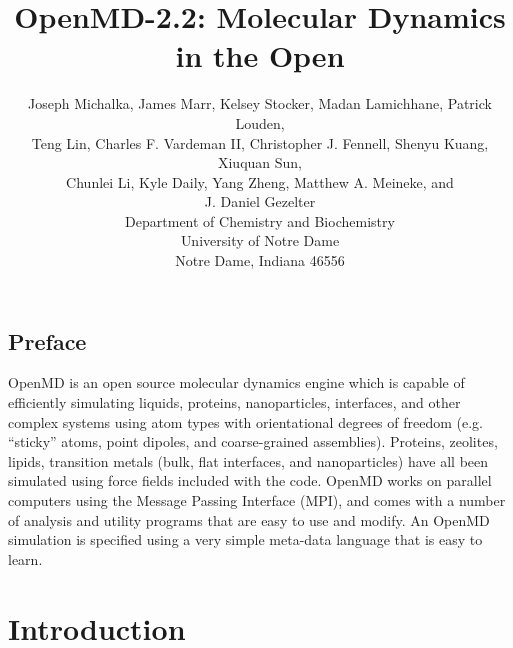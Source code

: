 \documentclass[]{book}
\begin{document}





\title{{\sc OpenMD-2.2}: Molecular Dynamics in the Open}

\author{Joseph Michalka, James Marr, Kelsey Stocker, Madan Lamichhane,
  Patrick Louden, \\
  Teng Lin, Charles F. Vardeman II, Christopher J. Fennell, Shenyu
  Kuang, Xiuquan Sun, \\
  Chunlei Li, Kyle Daily, Yang Zheng, Matthew A. Meineke, and \\
  J. Daniel Gezelter \\
  Department of Chemistry and Biochemistry\\
  University of Notre Dame\\
  Notre Dame, Indiana 46556}

\maketitle

\section*{Preface}
{\sc OpenMD} is an open source molecular dynamics engine which is capable of
efficiently simulating liquids, proteins, nanoparticles, interfaces,
and other complex systems using atom types with orientational degrees
of freedom (e.g. ``sticky'' atoms, point dipoles, and coarse-grained
assemblies). Proteins, zeolites, lipids, transition metals (bulk, flat
interfaces, and nanoparticles) have all been simulated using force
fields included with the code. {\sc OpenMD} works on parallel computers
using the Message Passing Interface (MPI), and comes with a number of
analysis and utility programs that are easy to use and modify. An
OpenMD simulation is specified using a very simple meta-data language
that is easy to learn.

\tableofcontents
\listoffigures
\listoftables
 
\mainmatter

\chapter{\label{sec:intro}Introduction}
\end{document}
